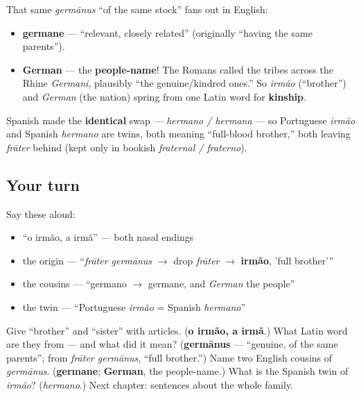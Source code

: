 \begin{cousinweb}
That same \emph{germānus} \textquotedblleft{}of the same stock\textquotedblright{} fans out in English:

\begin{itemize}
\raggedright
  \item \textbf{germane} — \textquotedblleft{}relevant, closely related\textquotedblright{} (originally \textquotedblleft{}having the same parents\textquotedblright{}).
  \item \textbf{German} — the \textbf{people-name}! The Romans called the tribes across the Rhine \emph{Germani}, plausibly \textquotedblleft{}the genuine/kindred ones.\textquotedblright{} So \emph{irmão} (\textquotedblleft{}brother\textquotedblright{}) and \emph{German} (the nation) spring from one Latin word for \textbf{kinship}.
\end{itemize}

Spanish made the \textbf{identical} swap — \emph{hermano / hermana} — so Portuguese \emph{irmão} and Spanish \emph{hermano} are twins, both meaning \textquotedblleft{}full-blood brother,\textquotedblright{} both leaving \emph{frāter} behind (kept only in bookish \emph{fraternal / fraterno}).
\end{cousinweb}

\subsection*{Your turn}
Say these aloud:

\begin{itemize}
\raggedright
  \item \textquotedblleft{}o irmão, a irmã\textquotedblright{} — both nasal endings
  \item the origin — \textquotedblleft{}\emph{frāter germānus} $\to$ drop \emph{frāter} $\to$ \textbf{irmão}, 'full brother'\textquotedblright{}
  \item the cousins — \textquotedblleft{}germano $\to$ germane, and \emph{German} the people\textquotedblright{}
  \item the twin — \textquotedblleft{}Portuguese \emph{irmão} = Spanish \emph{hermano}\textquotedblright{}
\end{itemize}

\begin{tcolorbox}[breakable,colback=teal!4,colframe=teal!35!black,title={Before you move on}]
Give \textquotedblleft{}brother\textquotedblright{} and \textquotedblleft{}sister\textquotedblright{} with articles. (\textbf{o irmão, a irmã}.) What Latin word are they from — and what did it mean? (\textbf{germānus} — \textquotedblleft{}genuine, of the same parents\textquotedblright{}; from \emph{frāter germānus}, \textquotedblleft{}full brother.\textquotedblright{}) Name two English cousins of \emph{germānus}. (\textbf{germane}; \textbf{German}, the people-name.) What is the Spanish twin of \emph{irmão}? (\emph{hermano}.) Next chapter: sentences about the whole family.
\end{tcolorbox}
